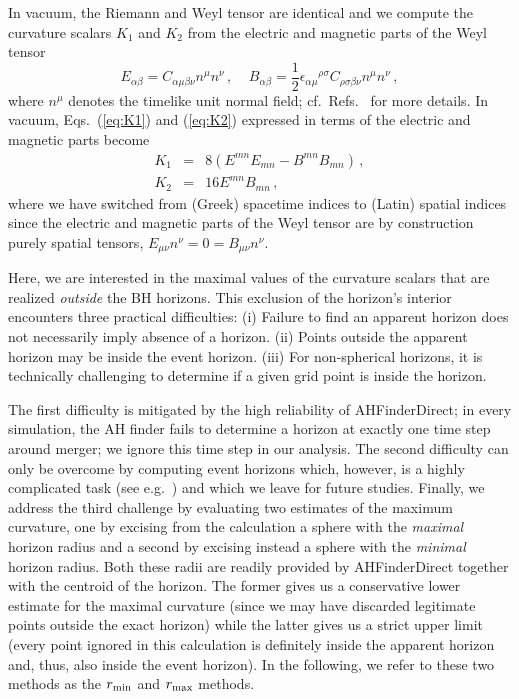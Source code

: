 \documentclass[floats,floatfix,showpacs,amssymb,prd,twocolumn,superscriptaddress,nofootinbib,nolongbibliography,reprint]{revtex4-2}
\begin{document}
In vacuum, the Riemann and Weyl tensor are identical
and we compute the curvature scalars $K_1$ and $K_2$
from the electric and magnetic parts of the Weyl tensor
%
\begin{equation}
  E_{\alpha\beta} = C_{\alpha \mu \beta\nu} n^{\mu}n^{\nu}\,,
  ~~~~~
  B_{\alpha\beta} = \frac{1}{2}
  \epsilon_{\alpha\mu}{}^{\rho \sigma}
  C_{\rho\sigma\beta\nu}n^{\mu}n^{\nu}\,,\end{equation}
%
where $n^{\mu}$ denotes the timelike unit normal field;
cf.~Refs.~\cite{Friedrich:1996hq,Sperhake:2006cy} for
more details. In vacuum, Eqs.~(\ref{eq:K1}) and (\ref{eq:K2})
expressed in terms of the electric and magnetic parts
become
%
\begin{eqnarray}
  K_1 &=& 8(E^{mn}E_{mn}-B^{mn}B_{mn})\,,
  \label{eq:K1EB}
  \\[10pt]
  K_2 &=& 16 E^{mn}B_{mn}\,,
\end{eqnarray}
%
where we have switched from (Greek) spacetime indices
to (Latin) spatial indices since the electric and magnetic
parts of the Weyl tensor are by construction purely spatial
tensors, $E_{\mu\nu}n^{\nu} = 0 = B_{\mu\nu}n^{\nu}$.

Here, we are interested in the maximal values of the
curvature scalars that are realized {\it outside} the
BH horizons. This exclusion of the horizon's interior
encounters three practical difficulties: (i) Failure
to find an apparent horizon does not necessarily imply
absence of a horizon. (ii) Points outside the
apparent horizon may be inside the event horizon. (iii)
For non-spherical horizons, it is technically challenging
to determine if a given grid point is inside the horizon.

The first difficulty is mitigated by the high reliability
of {\sc AHFinderDirect}; in every simulation, the AH finder fails to determine a horizon at exactly one time
step around merger; we ignore this time step in our analysis.
The second difficulty can only be overcome by computing
event horizons which, however, is a highly complicated
task (see e.g.~\cite{Diener:2003jc}) and which we leave for future studies. Finally, we address
the third challenge by evaluating two estimates
of the maximum curvature, one by excising from
the calculation a sphere with the {\it maximal}
horizon radius and a second by excising instead
a sphere with the {\it minimal} horizon radius.
Both these radii are readily provided by
{\sc AHFinderDirect} together with the
centroid of the horizon. The former gives us
a conservative lower estimate for the maximal
curvature (since we may have discarded legitimate points outside the exact horizon)
while the latter gives us a strict upper limit
(every point ignored in this calculation is
definitely inside the apparent horizon and, thus, also
inside the event horizon). In the following,
we refer to these two methods as the $r_{\rm min}$
and $r_{\rm max}$ methods.
\end{document}
